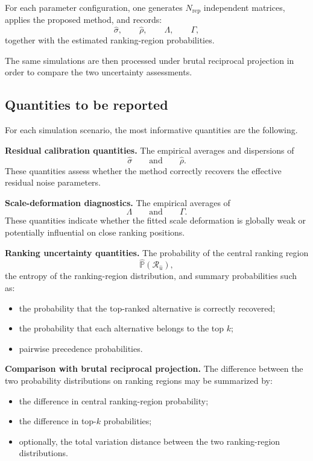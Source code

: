 \documentclass[11pt]{amsart}
\theoremstyle{definition}
\theoremstyle{plain}
\numberwithin{equation}{section}
\begin{document}
For each parameter configuration, one generates $N_{\mathrm{rep}}$ independent matrices, applies the proposed method, and records:
\[
\widehat\sigma,\qquad
\widehat\rho,\qquad
\Lambda,\qquad
\Gamma,
\]
together with the estimated ranking-region probabilities.

The same simulations are then processed under brutal reciprocal projection in order to compare the two uncertainty assessments.

\subsection{Quantities to be reported}

For each simulation scenario, the most informative quantities are the following.

\medskip

\noindent\textbf{Residual calibration quantities.}
The empirical averages and dispersions of
\[
\widehat\sigma
\qquad\text{and}\qquad
\widehat\rho.
\]
These quantities assess whether the method correctly recovers the effective residual noise parameters.

\medskip

\noindent\textbf{Scale-deformation diagnostics.}
The empirical averages of
\[
\Lambda
\qquad\text{and}\qquad
\Gamma.
\]
These quantities indicate whether the fitted scale deformation is globally weak or potentially influential on close ranking positions.

\medskip

\noindent\textbf{Ranking uncertainty quantities.}
The probability of the central ranking region
\[
\widehat{\mathbb P}(\mathcal R_{\widehat u}),
\]
the entropy of the ranking-region distribution, and summary probabilities such as:
\begin{itemize}
\item the probability that the top-ranked alternative is correctly recovered;
\item the probability that each alternative belongs to the top $k$;
\item pairwise precedence probabilities.
\end{itemize}

\medskip

\noindent\textbf{Comparison with brutal reciprocal projection.}
The difference between the two probability distributions on ranking regions may be summarized by:
\begin{itemize}
\item the difference in central ranking-region probability;
\item the difference in top-$k$ probabilities;
\item optionally, the total variation distance between the two ranking-region distributions.
\end{itemize}
\end{document}
